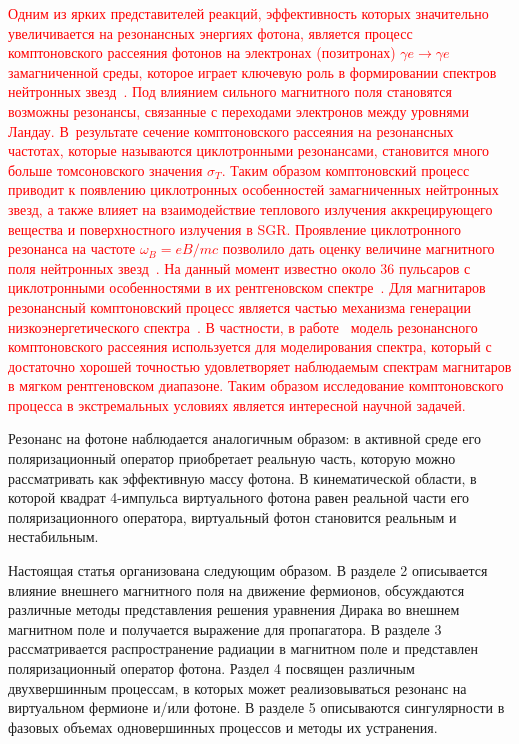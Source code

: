 \textcolor{red}{Одним из ярких представителей реакций, эффективность которых значительно увеличивается на резонансных энергиях фотона, является процесс комптоновского  рассеяния фотонов на электронах (позитронах) $\gamma e \to \gamma e$ 
замагниченной среды, которое играет ключевую роль в формировании спектров нейтронных звезд~\cite{Miller:1995,Bulik:1997,Suleimanov:2007it,Nobili:2008,Taverna:2014}.
Под влиянием сильного магнитного поля становятся возможны резонансы, связанные с переходами электронов между уровнями Ландау. В~результате сечение комптоновского рассеяния на резонансных частотах, которые называются циклотронными резонансами, становится много больше томсоновского значения $\sigma_T$. Таким образом комптоновский процесс приводит к появлению циклотронных особенностей замагниченных нейтронных звезд, а также влияет на взаимодействие теплового излучения аккрецирующего вещества и поверхностного излучения в SGR. Проявление циклотронного резонанса на частоте $\omega_B=eB/mc$ позволило дать оценку величине магнитного поля нейтронных звезд~\cite{Mitrofanov:1982}.  На данный момент известно около 36 пульсаров с циклотронными особенностями в их рентгеновском спектре~\cite{Staubert:2019}. Для магнитаров резонансный комптоновский процесс является частью механизма генерации низкоэнергетического спектра~\cite{Lyutikov:2002,Rea:2008}. В частности, в работе~\cite{Rea:2008} модель резонансного комптоновского рассеяния используется для моделирования спектра, который с достаточно хорошей точностью удовлетворяет наблюдаемым спектрам магнитаров в мягком рентгеновском диапазоне. Таким образом исследование комптоновского процесса в экстремальных условиях является интересной научной задачей.}



Резонанс на фотоне наблюдается аналогичным образом: в активной среде его поляризационный оператор приобретает реальную часть, которую можно рассматривать как эффективную массу фотона. В кинематической 
области, в которой квадрат 4-импульса виртуального фотона равен реальной части его поляризационного оператора, виртуальный фотон становится реальным и нестабильным.

Настоящая статья организована следующим образом. В разделе 2 описывается влияние внешнего магнитного поля на движение фермионов, обсуждаются различные методы представления решения уравнения Дирака во внешнем магнитном поле и получается выражение для пропагатора. В разделе 3 рассматривается распространение радиации в магнитном поле и представлен поляризационный оператор фотона. Раздел 4 посвящен различным двухвершинным процессам, в которых может 
реализовываться резонанс на виртуальном фермионе и/или фотоне. В разделе 5 описываются сингулярности в фазовых объемах одновершинных процессов и методы их устранения.